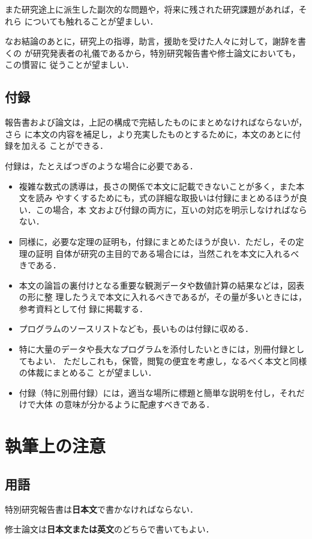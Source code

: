 \documentclass[master]{kuisthesis}		%
\let\EM\bf
\begin{document}
また研究途上に派生した副次的な問題や，将来に残された研究課題があれば，それら
についても触れることが望ましい．

なお結論のあとに，研究上の指導，助言，援助を受けた人々に対して，謝辞を書くの
が研究発表者の礼儀であるから，特別研究報告書や修士論文においても，この慣習に
従うことが望ましい．

\subsection{付録}\label{subsec-appendix}
報告書および論文は，上記の構成で完結したものにまとめなければならないが，さら
に本文の内容を補足し，より充実したものとするために，本文のあとに付録を加える
ことができる．

付録は，たとえばつぎのような場合に必要である．
\begin{itemize}%
\item
複雑な数式の誘導は，長さの関係で本文に記載できないことが多く，また本文を読み
やすくするためにも，式の詳細な取扱いは付録にまとめるほうが良い．この場合，本
文および付録の両方に，互いの対応を明示しなければならない．
\item
同様に，必要な定理の証明も，付録にまとめたほうが良い．ただし，その定理の証明
自体が研究の主目的である場合には，当然これを本文に入れるべきである．
\item
本文の論旨の裏付けとなる重要な観測データや数値計算の結果などは，図表の形に整
理したうえで本文に入れるべきであるが，その量が多いときには，参考資料として付
録に掲載する．
\item
プログラムのソースリストなども，長いものは付録に収める．
\item
特に大量のデータや長大なプログラムを添付したいときには，別冊付録としてもよい．
ただしこれも，保管，閲覧の便宜を考慮し，なるべく本文と同様の体裁にまとめるこ
とが望ましい．
\item
付録（特に別冊付録）には，適当な場所に標題と簡単な説明を付し，それだけで大体
の意味が分かるように配慮すべきである．
\end{itemize}%

\section{執筆上の注意}\label{sec-instruction}
\subsection{用語}\label{subsec-language}
特別研究報告書は{\EM 日本文}で書かなければならない．

修士論文は{\EM 日本文または英文}のどちらで書いてもよい．
\end{document}
